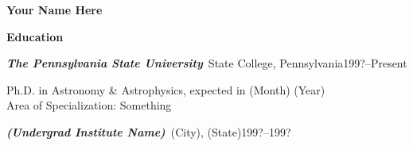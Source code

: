 \documentclass[11pt]{psuthesis}
\begin{document}
\begin{singlespace}



\vita
\Large
\vspace*{-0.4truein}
\centerline{{\bf Your Name Here}}

\medskip

\large
\centerline{{\bf Education}}
\normalsize

\smallskip

\par\noindent
\textbf{\textit{The Pennsylvania State University}}\, State College, Pennsylvania\hfill 199?--Present

\smallskip

\par\noindent
\hspace{0.10truein}  
\parbox{6.15truein}{
\par\noindent
Ph.D. in Astronomy \& Astrophysics, expected in (Month) (Year) \\ Area
of Specialization: Something }

\medskip

\par\noindent
\textbf{\textit{(Undergrad Institute Name)}}\, (City), (State)\hfill 199?--199?


\end{singlespace}
\end{document}
